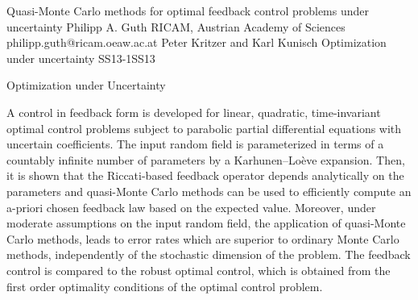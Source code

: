 \begin{talk}
  {Quasi-Monte Carlo methods for optimal feedback control problems under uncertainty}%
  {Philipp A. Guth}%
  {RICAM, Austrian Academy of Sciences}%
  {philipp.guth@ricam.oeaw.ac.at}%
  {Peter Kritzer and Karl Kunisch}%
{Optimization under uncertainty}
{}{SS13-1}{SS13}

  {Optimization under Uncertainty}%
			
A control in feedback form is developed for linear, quadratic, time-invariant optimal control problems subject to parabolic partial differential equations with uncertain coefficients. The input random field is parameterized in terms of a countably infinite number of parameters by a Karhunen–Lo\`eve expansion. Then, it is shown that the Riccati-based feedback operator depends analytically on the parameters and quasi-Monte Carlo methods can be used to efficiently compute an a-priori chosen feedback law based on the expected value. Moreover, under moderate assumptions on the input random field, the application of quasi-Monte Carlo methods, leads to error rates which are superior to ordinary Monte Carlo methods, independently of the stochastic dimension of the problem. The feedback control is compared to the robust optimal control, which is obtained from the first order optimality conditions of the optimal control problem.


\end{talk}

